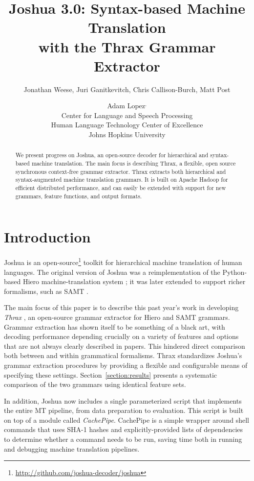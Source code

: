 \documentclass[11pt]{article}
\title{Joshua 3.0: Syntax-based Machine Translation \\ with the Thrax
  Grammar Extractor}
\author{Jonathan Weese\aff, Juri Ganitkevitch\aff, Chris
   Callison-Burch\aff, Matt Post\afff \and Adam Lopez\aff${}^\text{,}$\afff \\
 \aff Center for Language and Speech Processing \\
 \afff Human Language Technology Center of Excellence \\
 Johns Hopkins University}
\date{}
\begin{document}
\maketitle

\begin{abstract}
We present progress on Joshua, an open-source decoder for hierarchical
and syntax-based machine translation.  The main focus is describing
Thrax, a flexible, open source synchronous context-free grammar
extractor.  Thrax extracts both hierarchical \cite{Chiang2007} and
syntax-augmented machine translation \cite{samt2006} grammars.  It is
built on Apache Hadoop for efficient distributed performance, and can
easily be extended with support for new grammars, feature functions,
and output formats.
\end{abstract}

\section{Introduction}

Joshua is an open-source\footnote{\url{http://github.com/joshua-decoder/joshua}} toolkit for hierarchical machine translation
of human languages.  The original version of Joshua \cite{Joshua-WMT}
was a reimplementation of the Python-based Hiero machine-translation
system \cite{Chiang2007}; it was later extended \cite{li2010joshua} to
support richer formalisms, such as SAMT \cite{samt2006}.

The main focus of this paper is to describe this past year's work in
developing {\em Thrax} \cite{jonnymasters}, an open-source grammar extractor for Hiero and
SAMT grammars.  Grammar extraction has shown itself to be something of
a black art, with decoding performance depending crucially on a
variety of features and options that are not always clearly described in papers.
This hindered direct comparison both between and within grammatical formalisms.
Thrax standardizes Joshua's grammar extraction procedures by providing
a flexible and configurable means of specifying these settings.
Section~\ref{section:results} presents a systematic comparison of the
two grammars using identical feature sets.

In addition, Joshua now includes a single parameterized script that
implements the entire MT pipeline, from data preparation to
evaluation.  This script is built on top of a module called
\emph{CachePipe}.  CachePipe is a simple wrapper around shell commands
that uses SHA-1 hashes and explicitly-provided lists of dependencies
to determine whether a command needs to be run, saving time both in
running and debugging machine translation pipelines.
\end{document}
